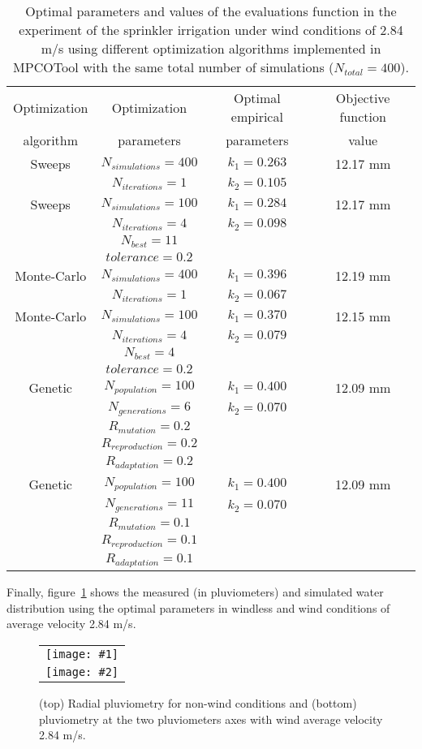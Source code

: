 \documentclass[review,authoryear]{elsarticle}
\newcommand{\TABLE}[5]
{
	\begin{table}[ht!]
		\centering
		\caption{#4.\label{#5}}
		#1
		\begin{tabular}{#2}
			#3
		\end{tabular}
	\end{table}
}
\newcommand{\FIGII}[4]
{
	\begin{figure}[ht!]
		\centering
		\begin{tabular}{c}
			\texttt{[image: \#1]} \\ \texttt{[image: \#2]}
		\end{tabular}
		\caption{#3.\label{#4}}
	\end{figure}
}
\begin{document}
\TABLE{\scriptsize}{cccc}
{
	Optimization & Optimization & Optimal empirical & Objective function
	\\ algorithm & parameters & parameters & value
	\\ \hline
	Sweeps & $N_{simulations}=400$ & $k_1=0.263$ & 12.17 mm
	\\ & $N_{iterations}=1$ & $k_2=0.105$
	\\ \hline
	Sweeps & $N_{simulations}=100$ & $k_1=0.284$ & 12.17 mm
	\\ & $N_{iterations}=4$ & $k_2=0.098$
	\\ & $N_{best}=11$
	\\ & $tolerance=0.2$
	\\ \hline
	Monte-Carlo & $N_{simulations}=400$ & $k_1=0.396$ & 12.19 mm
	\\ & $N_{iterations}=1$ & $k_2=0.067$
	\\ \hline
	Monte-Carlo & $N_{simulations}=100$ & $k_1=0.370$ & 12.15 mm
	\\ & $N_{iterations}=4$ & $k_2=0.079$
	\\ & $N_{best}=4$
	\\ & $tolerance=0.2$
	\\ \hline
	Genetic & $N_{population}=100$ & $k_1=0.400$ & 12.09 mm
	\\ & $N_{generations}=6$ & $k_2=0.070$
	\\ & $R_{mutation}=0.2$
	\\ & $R_{reproduction}=0.2$
	\\ & $R_{adaptation}=0.2$
	\\ \hline
	Genetic & $N_{population}=100$ & $k_1=0.400$ & 12.09 mm
	\\ & $N_{generations}=11$ & $k_2=0.070$
	\\ & $R_{mutation}=0.1$
	\\ & $R_{reproduction}=0.1$
	\\ & $R_{adaptation}=0.1$
	\\ \hline
}{Optimal parameters and values of the evaluations function in the experiment of the sprinkler irrigation under wind conditions of 2.84 m/s using different optimization algorithms implemented in MPCOTool with the same total number of simulations ($N_{total}=400$)}{TabSprinklerII}

Finally, figure~\ref{FigSprinkler} shows the measured (in pluviometers) and simulated water distribution using the optimal parameters in windless and wind conditions of average velocity 2.84 m/s.

\FIGII{sprinkler-0.eps}{sprinkler-2,84.eps}
{(top) Radial pluviometry for non-wind conditions and (bottom) pluviometry at
the two pluviometers axes with wind average velocity 2.84 m/s}{FigSprinkler}
\end{document}
